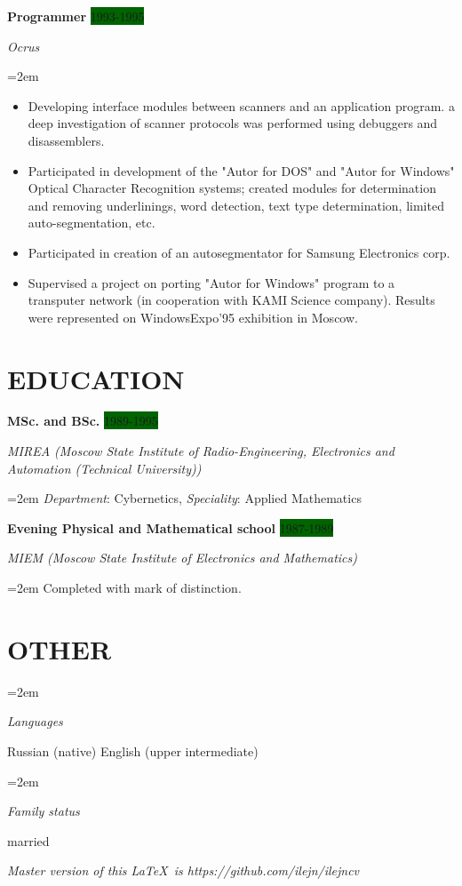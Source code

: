 \documentclass[paper=a4,fontsize=11pt]{scrartcl} %
\newlength{\spacebox}
\newcommand{\sepspace}{\vspace*{1em}}       %
\newcommand{\NewPart}[1]{\section*{\uppercase{#1}}}
\newcommand{\SkillsEntry}[2]{\pagebreak[2]    
        \noindent\hangindent=2em\hangafter=0 %
        \parbox{\spacebox}{        %
        \textit{#1}}               %
        \hspace{1.5em} \vspace{1em}  \parbox{0.8\textwidth}{#2} \par}    %
\newcommand{\EducationEntry}[4]{\pagebreak[2]
        \noindent \textbf{#1} \hfill      %
        \colorbox{DarkGreen}{%
            \hfill\color{White}#2} \par  %
        \noindent \textit{#3} \par        %
        \noindent\hangindent=2em\hangafter=0 \small #4 %
        \normalsize \par}
\newcommand{\WorkEntry}[4]{\pagebreak[2]    %
        \noindent \textbf{#1} \hfill      %
        \colorbox{DarkGreen}{\color{White}#2} \par  %
        \noindent \textit{#3} \par        %
        \noindent\hangindent=2em\hangafter=0 \small #4 %
        \normalsize \par         \sepspace}
\newcommand{\BottomLine}[1]{
        \vfill\center\textit{#1}\par
        }
\begin{document}
\WorkEntry{Programmer}{1993-1995}{Ocrus}{
\begin{itemize}\itemsep0em
\item Developing interface modules between scanners and an application program. a deep investigation of scanner protocols was performed using debuggers and disassemblers.
\item Participated in development of the "Autor for DOS" and "Autor  for  Windows" Optical Character  Recognition systems; created modules for determination and removing underlinings, word detection, text type determination, limited auto-segmentation, etc.
\item Participated in creation of an autosegmentator for Samsung Electronics corp.
\item Supervised a project on porting "Autor for Windows" program to a transputer network (in cooperation with KAMI Science company). Results were represented on WindowsExpo'95 exhibition in Moscow.  
\end{itemize}
}


\NewPart{Education}{}

\EducationEntry{MSc. and BSc.}{1989-1995}{MIREA (Moscow State Institute of Radio-Engineering, Electronics and Automation (Technical University))}{\textit{Department}: Cybernetics, \textit{Speciality}: Applied Mathematics}
\sepspace

\EducationEntry{Evening Physical and Mathematical school}{1987-1989}{MIEM (Moscow State Institute of Electronics and Mathematics)}{Completed with mark of distinction.}

\NewPart{Other}{}

\SkillsEntry{Languages}{Russian (native) 
   English (upper intermediate)}
\SkillsEntry{Family status}{married}



\BottomLine{Master version of this \LaTeX \ is https://github.com/ilejn/ilejncv }
\end{document}
